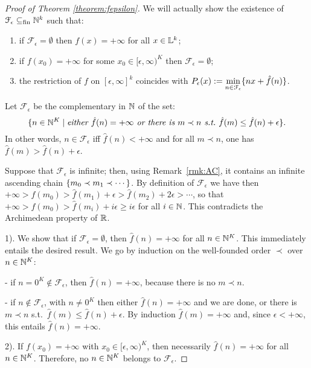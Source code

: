 \begin{proof}[Proof of Theorem \ref{theorem:fepsilon}]
We will actually show the existence of $\mathcal{F}_\epsilon \subseteq_{\mathrm{fin}} \mathbb{N}^k$ such that:
\begin{enumerate}
 \item if $\mathcal{F}_\epsilon= \emptyset$ then $f( x ) = +\infty$ for all $ x \in \mathbb{L}^k$;
 \item if $f( x _0) = +\infty$ for some $ x _0\in [\epsilon,\infty)^{K}$ then $\mathcal{F}_\epsilon= \emptyset$;
 \item the restriction of $f$ on $[\epsilon,\infty]^k$ coincides  with  $P_\epsilon(x):=\min\limits_{n\in \mathcal{F}_\epsilon}\{n x+\hat{f}(n)\}$.
\end{enumerate}
Let $\mathcal F_\epsilon$ be the complementary in $\mathbb{N}$ of the set:
\[
 \{ n  \in\mathbb{N}^{K} \mid \textit{either } \hat f ( n  )=+\infty \textit{ or there is }  m  \prec  n  \textit{ s.t.\ } \hat f( m  )\leq\hat f( n  )+\epsilon\}.
\]
In other words, $ n  \in\mathcal F_\epsilon$ iff $\hat f( n  )<+\infty$ and for all $ m  \prec  n  $, one has $\hat f( m  )>\hat f( n  )+\epsilon$.


Suppose that $\mathcal F_\epsilon$ is infinite; then, using Remark~\ref{rmk:AC}, it contains an infinite ascending chain $\{ m  _0\prec  m  _1\prec\cdots\}$.  
By definition of $\mathcal F_\epsilon$ we have then 
$+\infty>\hat f( m  _0)>\hat f( m  _1)+\epsilon>\hat f( m  _2)+2\epsilon>\cdots$, 
so that $+\infty>\hat f( m  _0)>\hat f( m  _{i})+i\epsilon\geq i\epsilon$ for all $i\in\mathbb{N}$.
This contradicts the Archimedean property of $\mathbb{R}$.

1).
We show that if $\mathcal F_\epsilon=\emptyset$, then $\hat f( n  )=+\infty$ for all $ n  \in\mathbb{N}^{K}$.
This immediately entails the desired result.
We go by induction on the well-founded order $\prec$ over $ n  \in\mathbb{N}^{K}$:

- if $ n  =0^{K}\notin\mathcal F_\epsilon$, then $\hat f( n  )=+\infty$, because there is no $ m  \prec n  $.

- if $ n  \notin\mathcal F_\epsilon$, with $ n  \neq 0^{K}$ then either $\hat f( n  )=+\infty$ and we are done, or there is $ m  \prec  n  $ s.t.\ $\hat f( m  )\leq \hat f( n  )+\epsilon$.
By induction $\hat f( m  )=+\infty$ and, since $\epsilon<+\infty$, this entails $\hat f( n  )=+\infty$.

2).
If $f( x _0)=+\infty$ with $ x _0\in [\epsilon,\infty)^{K}$, then necessarily $\hat f( n  )=+\infty$ for all $ n  \in\mathbb{N}^{K}$.
Therefore, no $ n  \in\mathbb{N}^{K}$ belongs to $\mathcal F_\epsilon$.


\end{proof}
